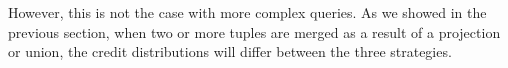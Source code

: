 However, this is not the case with more complex queries. As we showed in the previous section, when two or more tuples are merged as a result of a projection or union, the credit distributions will differ between the three strategies. %

